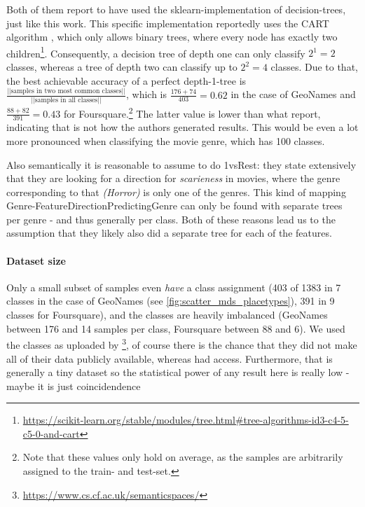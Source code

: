 Both of them report to have used the sklearn-implementation of decision-trees, just like this work. This specific implementation reportedly uses the CART algorithm \cite{breiman1984classification}, which only allows binary trees, where every node has exactly two children\footnote{\url{https://scikit-learn.org/stable/modules/tree.html\#tree-algorithms-id3-c4-5-c5-0-and-cart}}. Consequently, a decision tree of depth one can only classify $2^1 = 2$ classes, whereas a tree of depth two can classify up to $2^2=4$ classes. 
Due to that, the best achievable accuracy of a perfect depth-1-tree is $\frac{\text{||samples in two most common classes||}}{\text{||samples in all classes||}}$, which is $\frac{176+74}{403} = 0.62$ in the case of GeoNames and $\frac{88+82}{391} = 0.43$ for Foursquare.\footnote{Note that these values only hold on average, as the samples are arbitrarily assigned to the train- and test-set.} The latter value is lower than what \cite{Alshaikh2020} report, indicating that is not how the authors generated results. This would be even a lot more pronounced when classifying the movie genre, which has 100 classes. 

Also semantically it is reasonable to assume to do 1vsRest: they state extensively that they are looking for a direction for \textit{scarieness} in movies, where the genre corresponding to that \textit{(Horror)} is only one of the genres. This kind of mapping Genre-FeatureDirectionPredictingGenre can only be found with separate trees per genre - and thus generally per class. Both of these reasons lead us to the assumption that they likely also did a separate tree for each of the features.

\paragraph{Dataset size}
Only a small subset of samples even \textit{have} a class assignment (403 of 1383 in 7 classes in the case of GeoNames (see \autoref{fig:scatter_mds_placetypes}), 391 in 9 classes for Foursquare), and the classes are heavily imbalanced (GeoNames between 176 and 14 samples per class, Foursquare between 88 and 6). We used the classes as uploaded by \cite{Derrac2015}\footnote{\url{https://www.cs.cf.ac.uk/semanticspaces/}}, of course there is the chance that they did not make all of their data publicly available, whereas \cite{Ager2018, Alshaikh2020} had access. Furthermore, that is generally a tiny dataset so the statistical power of any result here is really low - maybe it is just coincidendence

